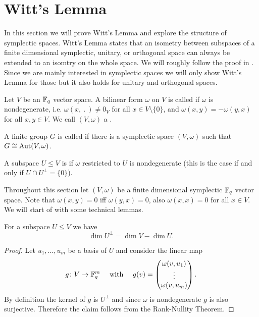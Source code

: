 \section{Witt's Lemma}\label{sec:witt}
In this section we will prove Witt's Lemma and explore the structure of symplectic spaces. Witt's Lemma states that an isometry between subspaces of a finite dimensional symplectic, unitary, or orthogonal space can always be extended to an isomtry on the whole space.  We will roughly follow the proof in \cite{Witt}. Since we are mainly interested in symplectic spaces we will only show Witt's Lemma for those but it also holds for unitary and orthogonal spaces.

\begin{definition}
Let $V$ be an $\mathbb{F}_q$ vector space. A bilinear form $\omega$ on $V$ is called  if $\omega$ is nondegenerate, i.e. $\omega(x,\ .\ )\not=0_V$ for all $x\in V\setminus\{0\}$, and $\omega(x,y)=-\omega(y,x)$ for all $x,y\in V$. We call $(V,\omega)$ a .

A finite group $G$ is called  if there is a symplectic space $(V,\omega)$ such that $G\cong\operatorname{Aut}(V,\omega)$. 

A subspace $U\leq V$ is  if $\omega$ restricted to $U$ is nondegenerate (this is the case if and only if $U\cap U^\bot=\{0\}$). 

\end{definition}
Throughout this section let $(V,\omega)$ be a finite dimensional symplectic $\mathbb{F}_q$ vector space.
Note that $\omega(x,y)=0$ iff $\omega(y,x)=0$, also $\omega(x,x)=0$ for all $x\in V$.
We will start of with some technical lemmas.



\begin{lemma}\label{lem:dimUBot}
For a subspace $U\leq V$ we have 
\[\dim U^\bot= \dim V -\dim U.\]
\end{lemma}
\begin{proof}
Let $u_1,\dots,u_m$ be a basis of $U$ and consider the linear map
\begin{align*}g\colon V\to \mathbb{F}_q^m&&\text{ with }&&g(v)=
\begin{pmatrix}
\omega(v,u_1)\\
\vdots\\
\omega(v,u_m)
\end{pmatrix}.
\end{align*}
By definition the kernel of $g$ is $U^\bot$ and since $\omega$ is nondegenerate $g$ is also surjective. Therefore the claim follows from the Rank-Nullity Theorem.
\end{proof}


